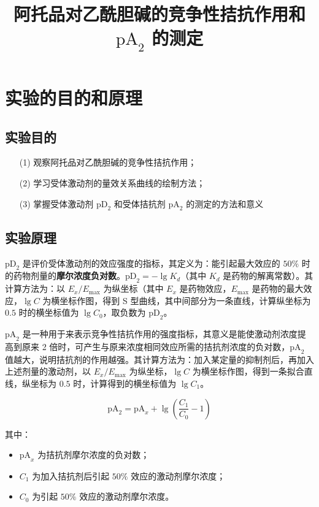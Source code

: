 \documentclass[UTF8]{ctexart}
\title{阿托品对乙酰胆碱的竞争性拮抗作用和 $\text{pA}_2$ 的测定}
\author{}
\begin{document}
\date{}
\maketitle

\section{实验的目的和原理}

\subsection{实验目的}

\begin{itemize}
    \item [(1)] 观察阿托品对乙酰胆碱的竞争性拮抗作用；
    \item [(2)] 学习受体激动剂的量效关系曲线的绘制方法；
    \item [(3)] 掌握受体激动剂 $\text{pD}_2$ 和受体拮抗剂 $\text{pA}_2$ 的测定的方法和意义
\end{itemize}

\subsection{实验原理}

$\text{pD}_2$ 是评价受体激动剂的效应强度的指标，其定义为：能引起最大效应的 $50\%$ 时的药物剂量的\textbf{摩尔浓度负对数}。$\text{pD}_2=-\lg K_d$（其中 $K_d$ 是药物的解离常数）。其计算方法为：以 $E_x/E_{\max}$ 为纵坐标（其中 $E_x$ 是药物效应，$E_{\max}$ 是药物的最大效应，$\lg C$ 为横坐标作图，得到 S 型曲线，其中间部分为一条直线，计算纵坐标为 $0.5$ 时的横坐标值为 $\lg C_0$，取负数为 $\text{pD}_2$。

$\text{pA}_2$ 是一种用于来表示竞争性拮抗作用的强度指标，其意义是能使激动剂浓度提高到原来 2 倍时，可产生与原来浓度相同效应所需的拮抗剂浓度的负对数，$\text{pA}_2$ 值越大，说明拮抗剂的作用越强。其计算方法为：加入某定量的抑制剂后，再加入上述剂量的激动剂，以 $E_x/E_{\max}$ 为纵坐标，$\lg C$ 为横坐标作图，得到一条拟合直线，纵坐标为 $0.5$ 时，计算得到的横坐标值为 $\lg C_1$。

$$
    \text{pA}_2=\text{pA}_x+\lg\left(\frac{C_1}{C_0}-1\right)
$$

其中：

\begin{itemize}
    \item $\text{pA}_x$ 为拮抗剂摩尔浓度的负对数；
    \item $C_1$ 为加入拮抗剂后引起 $50\%$ 效应的激动剂摩尔浓度；
    \item $C_0$ 为引起 $50\%$ 效应的激动剂摩尔浓度。
\end{itemize}
\end{document}
